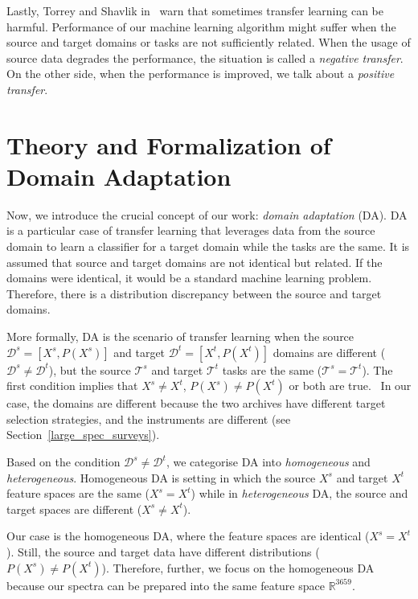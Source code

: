 Lastly, Torrey and Shavlik in~\cite{torrey2010} warn
that sometimes transfer learning can be harmful.
Performance of our machine learning algorithm might suffer
when the source and target domains or tasks are not sufficiently related.
When the usage of source data degrades the performance,
the situation is called a \textit{negative transfer}.
On the other side, when the performance is improved,
we talk about a \textit{positive transfer}.

\section{Theory and Formalization of Domain Adaptation}

Now, we introduce the crucial concept of our work: \textit{domain adaptation} (DA).
DA is a particular case of transfer learning
that leverages data from the source domain to learn a classifier for a target domain while the tasks are the same.
It is assumed that source and target domains are not identical but related.
If the domains were identical, it would be a standard machine learning problem.
Therefore, there is a distribution discrepancy between the source and target domains.~\cite{csurka2017}

More formally, DA is the scenario of transfer learning
when the source \(\mathcal{D}^s = [X^s, P(X^s)]\)
and target \(\mathcal{D}^t = [X^t, P(X^t)]\) domains
are different (\(\mathcal{D}^s \ne \mathcal{D}^t\)),
but the source \(\mathcal{T}^s\) and target \(\mathcal{T}^t\)
tasks are the same (\(\mathcal{T}^s = \mathcal{T}^t\)).
The first condition implies
that \(X^s \ne X^t\), \(P(X^s) \ne P(X^t)\) or both are true.~\cite{pan2010}
In our case, the domains are different
because the two archives have different target selection strategies,
and the instruments are different (see Section~\ref{large_spec_surveys}).

Based on the condition \(\mathcal{D}^s \ne \mathcal{D}^t\),
we categorise DA into \textit{homogeneous} and \textit{heterogeneous}.
Homogeneous DA is setting in which the source \(X^s\)
and target \(X^t\) feature spaces are the same (\(X^s = X^t\))
while in \textit{heterogeneous} DA, the source and target spaces are different
(\(X^s \ne X^t\)).~\cite{csurka2017}

Our case is the homogeneous DA,
where the feature spaces are identical (\(X^s = X^t\)).
Still, the source and target data have different distributions (\(P(X^s) \ne P(X^t)\)).
Therefore, further, we focus on the homogeneous DA
because our spectra can be prepared into the same feature space \(\mathbb{R}^{3659}\).

